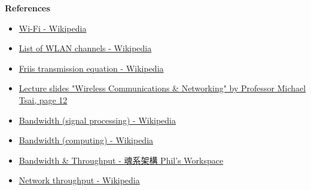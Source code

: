 \documentclass[12pt, a4paper]{article}
\begin{document}
  \textbf{References}
  \begin{footnotesize}
    \begin{itemize}
      \item \href{https://en.wikipedia.org/wiki/Wi-Fi}{Wi-Fi - Wikipedia}
      \item \href{https://en.wikipedia.org/wiki/List_of_WLAN_channels}{List of WLAN channels - Wikipedia}
      \item \href{https://en.wikipedia.org/wiki/Friis_transmission_equation}{Friis transmission equation - Wikipedia}
      \item \href{https://cool.ntu.edu.tw/courses/33591/files/5577514}{Lecture slides "Wireless Communications \& Networking" by Professor Michael Tsai, page 12}
      \item \href{https://en.wikipedia.org/wiki/Bandwidth_(signal_processing)}{Bandwidth (signal processing) - Wikipedia}
      \item \href{https://en.wikipedia.org/wiki/Bandwidth_(computing)}{Bandwidth (computing) - Wikipedia}
      \item \href{https://blog.pichuang.com.tw/20190527-bandwidth-and-throughput.html}{Bandwidth \& Throughput - 魂系架構 Phil's Workspace}
      \item \href{https://en.wikipedia.org/wiki/Network_throughput}{Network throughput - Wikipedia}
    \end{itemize}
  \end{footnotesize}
\end{document}

